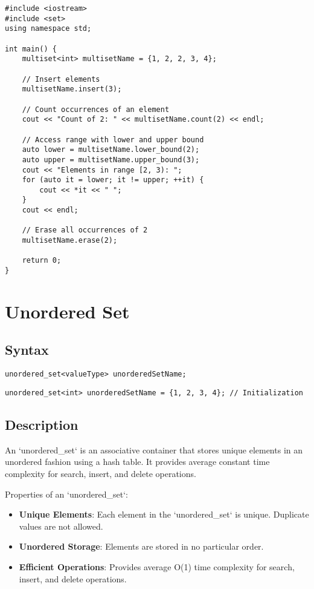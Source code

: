 \documentclass{article}
\begin{document}
\begin{lstlisting}
#include <iostream>
#include <set>
using namespace std;

int main() {
    multiset<int> multisetName = {1, 2, 2, 3, 4};
    
    // Insert elements
    multisetName.insert(3);

    // Count occurrences of an element
    cout << "Count of 2: " << multisetName.count(2) << endl;

    // Access range with lower and upper bound
    auto lower = multisetName.lower_bound(2);
    auto upper = multisetName.upper_bound(3);
    cout << "Elements in range [2, 3): ";
    for (auto it = lower; it != upper; ++it) {
        cout << *it << " ";
    }
    cout << endl;

    // Erase all occurrences of 2
    multisetName.erase(2);

    return 0;
}
\end{lstlisting}

\newpage
\section{Unordered Set}

\subsection{Syntax}

\begin{lstlisting}
unordered_set<valueType> unorderedSetName;
\end{lstlisting}

\begin{lstlisting}
unordered_set<int> unorderedSetName = {1, 2, 3, 4}; // Initialization
\end{lstlisting}

\subsection{Description}

An `unordered\_set` is an associative container that stores unique elements in an unordered fashion using a hash table. It provides average constant time complexity for search, insert, and delete operations.

\noindent Properties of an `unordered\_set`:
\begin{itemize}
    \item \textbf{Unique Elements}: Each element in the `unordered\_set` is unique. Duplicate values are not allowed.
    \item \textbf{Unordered Storage}: Elements are stored in no particular order.
    \item \textbf{Efficient Operations}: Provides average O(1) time complexity for search, insert, and delete operations.
\end{itemize}
\end{document}
